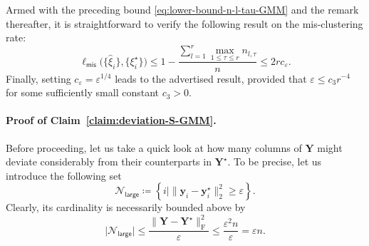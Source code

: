 \bigskip
{}
%
Armed with the preceding bound \eqref{eq:lower-bound-n-l-tau-GMM} and the remark thereafter,
it is straightforward to verify the following result on the mis-clustering rate:
%
\[
\ell_{\mathsf{mis}}\big(\{\widehat{\xi}_{i}\},\{\xi_{i}^{\star}\}\big)\leq1-\frac{\sum_{l=1}^{r}\max_{1\leq\tau\leq r}n_{l,\tau}}{n}\leq2rc_{\varepsilon}.
\]
%
Finally, setting $c_{\varepsilon} = \varepsilon^{1/4}$ leads to the advertised result,
provided that $\varepsilon\leq c_{3}r^{-4}$ for some sufficiently small constant $c_3>0$.





\paragraph{Proof of Claim~\ref{claim:deviation-S-GMM}.}
%
Before proceeding, let us take a quick look at how many columns
of $\bm{Y}$ might deviate considerably from their counterparts in
$\bm{Y}^{\star}$. To be precise, let us introduce the following set
%
\begin{equation}
	\mathcal{N}_{\mathsf{large}}\coloneqq\left\{ i\mid\|\bm{y}_{i}-\bm{y}_{i}^{\star}\|_{2}^{2}\geq\varepsilon\right\} .
	\label{eq:defn-Nlarge-GMM}
\end{equation}
%
Clearly, its cardinality is necessarily bounded above by
%
\begin{equation}
	\big|\mathcal{N}_{\mathsf{large}}\big|\leq\frac{\big\|\bm{Y}-\bm{Y}^{\star}\big\|_{\mathrm{F}}^{2}}{\varepsilon}\leq\frac{\varepsilon^{2}n}{\varepsilon}=\varepsilon n.
	\label{eq:size-Nlarge-UB-GMM}
\end{equation}
%


